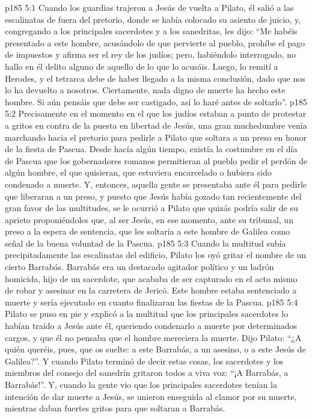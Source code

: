 \vs p185 5:1 Cuando los guardias trajeron a Jesús de vuelta a Pilato, él salió a las escalinatas de fuera del pretorio, donde se había colocado su asiento de juicio, y, congregando a los principales sacerdotes y a los sanedritas, les dijo: “Me habéis presentado a este hombre, acusándolo de que pervierte al pueblo, prohíbe el pago de impuestos y afirma ser el rey de los judíos; pero, habiéndolo interrogado, no hallo en él delito alguno de aquello de lo que lo acusáis. Luego, lo remití a Herodes, y el tetrarca debe de haber llegado a la misma conclusión, dado que nos lo ha devuelto a nosotros. Ciertamente, nada digno de muerte ha hecho este hombre. Si aún pensáis que debe ser castigado, así lo haré antes de soltarlo”.
\vs p185 5:2 Precisamente en el momento en el que los judíos estaban a punto de protestar a gritos en contra de la puesta en libertad de Jesús, una gran muchedumbre venía marchando hacia el pretorio para pedirle a Pilato que soltara a un preso en honor de la fiesta de Pascua. Desde hacía algún tiempo, existía la costumbre en el día de Pascua que los gobernadores romanos permitieran al pueblo pedir el perdón de algún hombre, el que quisieran, que estuviera encarcelado o hubiera sido condenado a muerte. Y, entonces, aquella gente se presentaba ante él para pedirle que liberaran a un preso, y puesto que Jesús había gozado tan recientemente del gran favor de las multitudes, se le ocurrió a Pilato que quizás podría salir de su aprieto proponiéndoles que, al ser Jesús, en ese momento, ante su tribunal, un preso a la espera de sentencia, que les soltaría a este hombre de Galilea como señal de la buena voluntad de la Pascua.
\vs p185 5:3 Cuando la multitud subía precipitadamente las escalinatas del edificio, Pilato los oyó gritar el nombre de un cierto Barrabás. Barrabás era un destacado agitador político y un ladrón homicida, hijo de un sacerdote, que acababa de ser capturado en el acto mismo de robar y asesinar en la carretera de Jericó. Este hombre estaba sentenciado a muerte y sería ejecutado en cuanto finalizaran las fiestas de la Pascua.
\vs p185 5:4 Pilato se puso en pie y explicó a la multitud que los principales sacerdotes lo habían traído a Jesús ante él, queriendo condenarlo a muerte por determinados cargos, y que él no pensaba que el hombre mereciera la muerte. Dijo Pilato: “¿A quién queréis, pues, que os suelte: a este Barrabás, a un asesino, o a este Jesús de Galilea?”. Y cuando Pilato terminó de decir estas cosas, los sacerdotes y los miembros del consejo del sanedrín gritaron todos a viva voz: “¡A Barrabás, a Barrabás!”. Y, cuando la gente vio que los principales sacerdotes tenían la intención de dar muerte a Jesús, se unieron enseguida al clamor por su muerte, mientras daban fuertes gritos para que soltaran a Barrabás.
